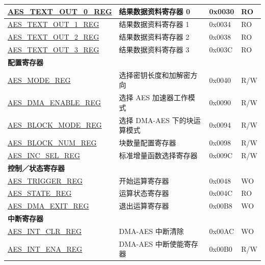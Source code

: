 \begin{longtable}{ | p{5.2cm} | p{6.6cm} | p{2cm} | p{1.2cm} | }
\hyperref[regdesc:AESTEXTOUTnREG]{AES\_TEXT\_OUT\_0\_REG}		&	结果数据资料寄存器 0					& 0x0030 & RO \\ \hline
\hyperref[regdesc:AESTEXTOUTnREG]{AES\_TEXT\_OUT\_1\_REG}		&	结果数据资料寄存器 1					& 0x0034 & RO \\ \hline
\hyperref[regdesc:AESTEXTOUTnREG]{AES\_TEXT\_OUT\_2\_REG}		&	结果数据资料寄存器 2					& 0x0038 & RO \\ \hline
\hyperref[regdesc:AESTEXTOUTnREG]{AES\_TEXT\_OUT\_3\_REG}		&	结果数据资料寄存器 3					& 0x003C & RO \\ \hline

\multicolumn{4}{|l|}{\textbf{配置寄存器}} \\ \hline

\hyperref[regdesc:AESMODEREG]{AES\_MODE\_REG}				            & 选择密钥长度和加解密方向			    & 0x0040 & R/W \\ \hline
\hyperref[regdesc:AESDMAENABLEREG]{AES\_DMA\_ENABLE\_REG}		        &	选择 AES 加速器工作模式					                & 0x0090 & R/W \\ \hline
\hyperref[regdesc:AESBLOCKMODEREG]{AES\_BLOCK\_MODE\_REG}		        &	选择 DMA-AES 下的块运算模式			        & 0x0094 & R/W \\ \hline
\hyperref[regdesc:AESBLOCKNUMREG]{AES\_BLOCK\_NUM\_REG}		   	        &	块数量配置寄存器			        & 0x0098 & R/W \\ \hline
\hyperref[regdesc:AESINCSELREG]{AES\_INC\_SEL\_REG}			            &	标准增量函数选择寄存器               & 0x009C & R/W \\ \hline

\multicolumn{4}{|l|}{\textbf{控制／状态寄存器}} \\ \hline

\hyperref[regdesc:AESTRIGGERREG]{AES\_TRIGGER\_REG}			&	开始运算寄存器		& 0x0048 & WO \\ \hline
\hyperref[regdesc:AESSTATEREG]{AES\_STATE\_REG}				&	运算状态寄存器			& 0x004C & RO \\ \hline
\hyperref[regdesc:AESDMAEXITREG]{AES\_DMA\_EXIT\_REG}		&	退出运算寄存器	& 0x00B8 & WO \\ \hline

\multicolumn{4}{|l|}{\textbf{中断寄存器}} \\ \hline

\hyperref[regdesc:AESINTCLRREG]{AES\_INT\_CLR\_REG}			&	DMA-AES 中断清除	& 0x00AC & WO \\ \hline
\hyperref[regdesc:AESINTENAREG]{AES\_INT\_ENA\_REG}			&	DMA-AES 中断使能寄存器	& 0x00B0 & R/W \\ \hline

\end{longtable}
